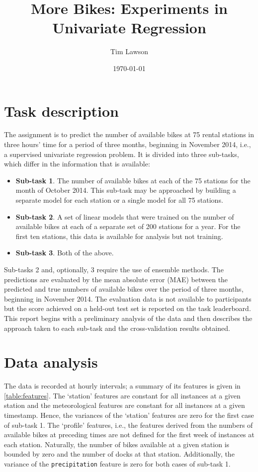 \documentclass[11pt]{extarticle}
\begin{document}
\title{More Bikes: Experiments in Univariate Regression}
\author{Tim Lawson}
\date{\today}

\maketitle

\section{Task description}

The assignment is to predict the number of available bikes at 75 rental stations in
three hours' time for a period of three months, beginning in November 2014, i.e., a
supervised univariate regression problem.
It is divided into three sub-tasks, which differ in the information that is available:
\begin{itemize}
  \item \textbf{Sub-task 1}.
        The number of available bikes at each of the 75 stations for the month of October 2014.
        This sub-task may be approached by building a separate model for each station or a
        single model for all 75 stations.
  \item \textbf{Sub-task 2}.
        A set of linear models that were trained on the number of available bikes at each of a
        separate set of 200 stations for a year.
        For the first ten stations, this data is available for analysis but not training.
  \item \textbf{Sub-task 3}.
        Both of the above.
\end{itemize}
Sub-tasks 2 and, optionally, 3 require the use of ensemble methods.
The predictions are evaluated by the mean absolute error (MAE) between the predicted
and true numbers of available bikes over the period of three months, beginning in
November 2014.
The evaluation data is not available to participants but the score achieved on a
held-out test set is reported on the task leaderboard.
This report begins with a preliminary analysis of the data and then describes the
approach taken to each sub-task and the cross-validation results obtained.

\section{Data analysis}

The data is recorded at hourly intervals; a summary of its features is given in
\cref{table:features}.
The `station' features are constant for all instances at a given station and the
meteorological features are constant for all instances at a given timestamp.
Hence, the variances of the `station' features are zero for the first case of sub-task
1.
The `profile' features, i.e., the features derived from the numbers of available bikes
at preceding times are not defined for the first week of instances at each station.
Naturally, the number of bikes available at a given station is bounded by zero and the
number of docks at that station.
Additionally, the variance of the \texttt{precipitation} feature is zero for both cases
of sub-task 1.
\end{document}
